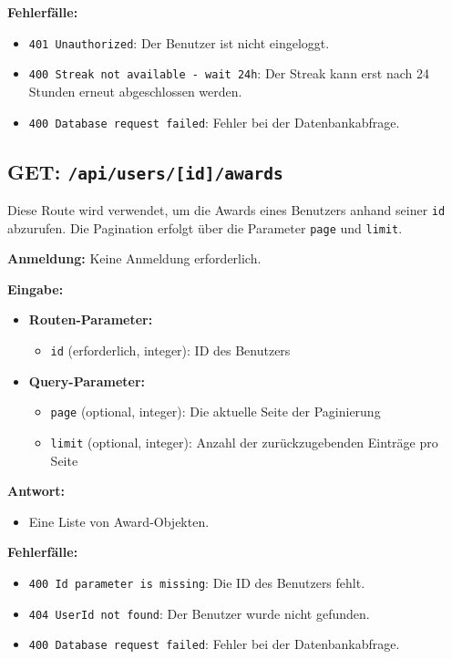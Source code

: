 \documentclass[a4paper,12pt]{article}
\begin{document}
\textbf{Fehlerfälle:}
\begin{itemize}
    \item \texttt{401 Unauthorized}:
        Der Benutzer ist nicht eingeloggt.
    \item \texttt{400 Streak not available - wait 24h}:
        Der Streak kann erst nach 24 Stunden erneut abgeschlossen werden.
    \item \texttt{400 Database request failed}:
        Fehler bei der Datenbankabfrage.
\end{itemize}

\newpage
\subsection{GET: \texttt{/api/users/[id]/awards}}

Diese Route wird verwendet, um die Awards eines Benutzers anhand seiner
\texttt{id} abzurufen. Die Pagination erfolgt über die Parameter \texttt{page}
und \texttt{limit}.

\textbf{Anmeldung:} Keine Anmeldung erforderlich.

\textbf{Eingabe:}
\begin{itemize}
    \item \textbf{Routen-Parameter:}
    \begin{itemize}
        \item \texttt{id} (erforderlich, integer):
            ID des Benutzers
    \end{itemize}
    \item \textbf{Query-Parameter:}
    \begin{itemize}
        \item \texttt{page} (optional, integer):
            Die aktuelle Seite der Paginierung
        \item \texttt{limit} (optional, integer):
            Anzahl der zurückzugebenden Einträge pro Seite
    \end{itemize}
\end{itemize}

\textbf{Antwort:}
\begin{itemize}
    \item Eine Liste von Award-Objekten.
\end{itemize}

\textbf{Fehlerfälle:}
\begin{itemize}
    \item \texttt{400 Id parameter is missing}:
        Die ID des Benutzers fehlt.
    \item \texttt{404 UserId not found}:
        Der Benutzer wurde nicht gefunden.
    \item \texttt{400 Database request failed}:
        Fehler bei der Datenbankabfrage.
\end{itemize}
\end{document}
